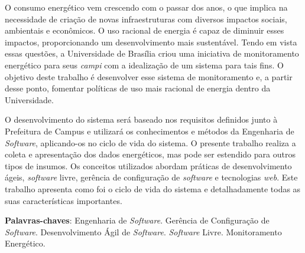 \begin{resumo}
O consumo energético vem crescendo com o passar dos anos, o que implica na necessidade de criação de novas infraestruturas com diversos impactos sociais, ambientais e econômicos. O uso racional de energia é capaz de diminuir esses impactos, proporcionando um desenvolvimento mais sustentável. Tendo em vista essas questões, a Universidade de Brasília criou uma iniciativa de monitoramento energético para seus \textit{campi} com a idealização de um sistema para tais fins. O objetivo deste trabalho é desenvolver esse sistema de monitoramento e, a partir desse ponto, fomentar políticas de uso mais racional de energia dentro da Universidade.

O desenvolvimento do sistema será baseado nos requisitos definidos junto à Prefeitura de Campus e utilizará os conhecimentos e métodos da Engenharia de \textit{Software}, aplicando-os no ciclo de vida do sistema. O presente trabalho realiza a coleta e apresentação dos dados energéticos, mas pode ser estendido para outros tipos de insumos. Os conceitos utilizados abordam práticas de desenvolvimento ágeis, \textit{software} livre, gerência de configuração de \textit{software} e tecnologias \textit{web}. Este trabalho apresenta como foi o ciclo de vida do sistema e detalhadamente todas as suas características importantes.

 \vspace{\onelineskip}

 \noindent
 \textbf{Palavras-chaves}: Engenharia de \textit{Software}. Gerência de Configuração de \textit{Software}. Desenvolvimento Ágil de \textit{Software}. \textit{Software} Livre. Monitoramento Energético.
\end{resumo}